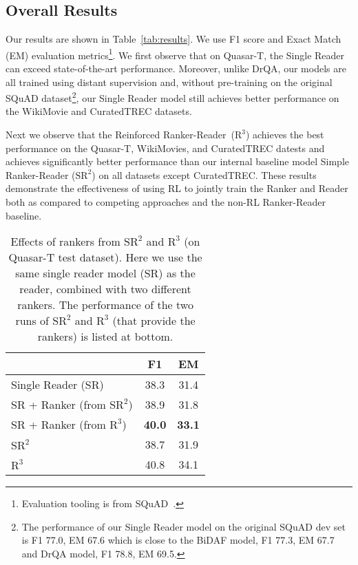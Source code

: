\documentclass[letterpaper]{article} \usepackage{aaai18}  \usepackage{times}  \usepackage{helvet}  \usepackage{courier}  \usepackage{url}  \usepackage{graphicx}  \usepackage{comment}
\begin{document}
\subsection{Overall Results}
Our results are shown in Table~\ref{tab:results}. We use F1 score and Exact Match (EM) evaluation metrics\footnote{Evaluation tooling is from SQuAD~\cite{rajpurkar2016squad}.}.  We first observe that on Quasar-T, the Single Reader can exceed state-of-the-art performance. Moreover, unlike DrQA, our models are all trained using distant supervision and, without pre-training on the original SQuAD dataset\footnote{The performance of our Single Reader model on the original SQuAD dev set is F1 77.0, EM 67.6 which is close to the BiDAF model, F1 77.3, EM 67.7 and DrQA model, F1 78.8, EM 69.5.}, our Single Reader model still achieves better performance on the WikiMovie and CuratedTREC datasets. 

Next we observe that the Reinforced Ranker-Reader~($\text{R}^3$) achieves the best performance on the Quasar-T, WikiMovies, and CuratedTREC datests and achieves significantly better performance than our internal baseline model Simple Ranker-Reader ($\text{SR}^2$) on all datasets except CuratedTREC.
These results demonstrate the effectiveness of using RL to jointly train the Ranker and Reader both as compared to competing approaches and the non-RL Ranker-Reader baseline. 


\begin{table}[t]
\centering
\begin{tabular}{lcc}
\toprule
                  & F1            & EM \\
                  \midrule
Single Reader (SR) & 38.3 & 31.4 \\
SR + Ranker (from $\text{SR}^2$)  & 38.9 & 31.8 \\
SR + Ranker (from $\text{R}^3$)  & \textbf{40.0} & \textbf{33.1}  \\ 
\midrule
$\text{SR}^2$  & 38.7 & 31.9 \\
$\text{R}^3$  & {40.8} & {34.1}  \\ 
\bottomrule
                  \end{tabular}
\caption{Effects of rankers from $\text{SR}^2$ and $\text{R}^3$ (on Quasar-T test dataset). Here we use the same single reader model (SR) as the reader, combined with two different rankers.
The performance of the two runs of $\text{SR}^2$ and $\text{R}^3$ (that provide the rankers) is listed at bottom.
}
\label{tab:analysis1}
\end{table}
\end{document}
